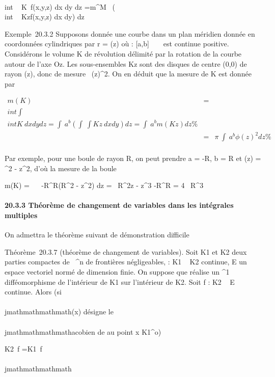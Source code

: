 \int  \\int ~
\int  K~f(x,y,z) dx dy dz
=\int  m^M~\left
(\int  \\int ~
Kzf(x,y,z) dx dy\right ) dz

Exemple~20.3.2 Supposons donnée une courbe dans un plan méridien donnée
en coordonnées cylindriques par r = \phi(z) où \phi : {[}a,b{]} \rightarrow~ ~ est
continue positive. Considérons le volume K de révolution délimité par la
rotation de la courbe autour de l'axe Oz. Les sous-ensembles
Kz sont des disques de centre (0,0) de rayon \phi(z), donc de
mesure \pi~\phi(z)^2. On en déduit que la mesure de K est donnée
par

\begin{align*} m(K)& =& \\int
 \int  \\int  K~
dx dy dz =\int ~
a^b\left (\int ~
\int  Kz~ dx
dy\right ) dz =\int ~
a^bm(K z) dz\%&
\\ & =& \pi~\int ~
a^b\phi(z)^2 dz \%&
\\ \end{align*}

Par exemple, pour une boule de rayon R, on peut prendre a = -R, b = R et
\phi(z) = \sqrtR^2  - z^2, d'où la
mesure de la boule

m(K) = \pi~\int ~
-R^R(R^2 - z^2) dz =
\pi~\left {[}R^2z - z^3
 \right {]}-R^R
= 4  \pi~R^3

\paragraph{20.3.3 Théorème de changement de variables dans les
intégrales multiples}

On admettra le théorème suivant de démonstration difficile

Théorème~20.3.7 (théorème de changement de variables). Soit K1
et K2 deux parties compactes de ~^n de frontières
négligeables, \phi : K1 \rightarrow~ K2 continue, E un espace
vectoriel normé de dimension finie. On suppose que \phi réalise un
^1 difféomorphisme de l'intérieur de K1 sur
l'intérieur de K2. Soit f : K2 \rightarrow~ E continue. Alors
(si \\\\jmathmathmathmath\phi(x) désigne le \\\\jmathmathmathmathacobien de \phi au point x \in
K1^o)

\int  K2~f
=\int  K1~f \cdot \phi
\textbar{}\\\\jmathmathmathmath\phi\textbar{}

